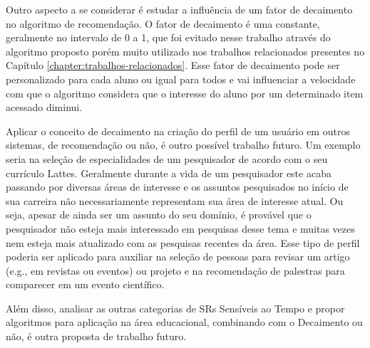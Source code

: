 Outro aspecto a se considerar é estudar a influência de um fator de decaimento no algoritmo de recomendação. O fator de
decaimento é uma constante, geralmente no intervalo de 0 a 1, que foi evitado nesse trabalho através do algoritmo proposto
porém muito utilizado nos trabalhos relacionados presentes no Capítulo \ref{chapter:trabalhos-relacionados}. Esse
fator de decaimento pode ser personalizado para cada aluno ou igual para todos e vai influenciar a velocidade com que o
algoritmo considera que o interesse do aluno por um determinado item acessado diminui.

Aplicar o conceito de decaimento na criação do perfil de um usuário em outros sistemas, de recomendação ou não, é outro
possível trabalho futuro. Um exemplo seria na seleção de especialidades de um pesquisador de acordo com o seu currículo
Lattes. Geralmente durante a vida de um pesquisador este acaba passando por diversas áreas de interesse e os assuntos
pesquisados no início de sua carreira não necessariamente representam sua área de interesse atual. Ou seja, apesar de
ainda ser um assunto do seu domínio, é provável que o pesquisador não esteja mais interessado em pesquisas desse tema e
muitas vezes nem esteja mais atualizado com as pesquisas recentes da área. Esse tipo de perfil poderia ser aplicado para
auxiliar na seleção de pessoas para revisar um artigo (e.g., em revistas ou eventos) ou projeto e na recomendação de palestras
para comparecer em um evento científico.

Além disso, analisar as outras categorias de SRs Sensíveis ao Tempo e propor algoritmos para aplicação na área educacional,
combinando com o Decaimento ou não, é outra proposta de trabalho futuro.
